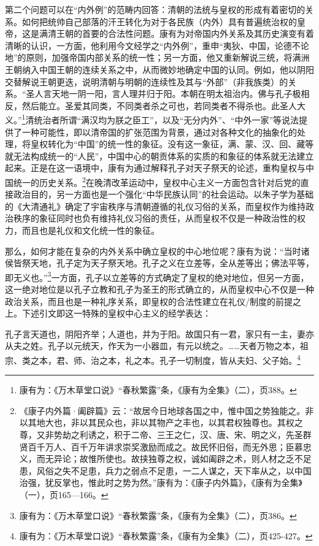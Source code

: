 \documentclass[a4paper, 12pt, openright]{ctexbook}
\renewenvironment{quote}
  {\list{}{\rightmargin2\ccwd \leftmargin2\ccwd \itemindent=2\ccwd \listparindent=2\ccwd}%
   \item\relax\small\kaishu\color{black}}
  {\endlist}
\begin{document}
第二个问题可以在“内外例”的范畴内回答：清朝的法统与皇权的形成有着密切的关系。如何把统帅自己部落的汗王转化为对于各民族（内外）具有普遍统治权的皇帝，这是满清王朝的首要的合法性问题。康有为对帝国内外关系及其历史演变有着清晰的认识，一方面，他利用今文经学之“内外例”，重申“夷狄、中国，论德不论地”的原则，加强帝国内部关系的统一性；另一方面，他又重新解说三统，将满洲王朝纳入中国王朝的连续关系之中，从而微妙地确定中国的认同。例如，他以阴阳交替解说王朝更迭，说明清朝与明朝的连续性及其与“外部”（非我族类）的关系。“圣人言天地一阴一阳，言人理并归于阳。本朝在明太祖治内。佛与孔子极相反，然后能立。圣爱其同类，不同类者杀之可也，若同类者不得杀也。此圣人大义。”\footnote{康有为：《万木草堂口说》“春秋繁露”条，《康有为全集》（二），页388。}清统治者所谓“满汉均为朕之臣工”，以及“无分内外”、“中外一家”等说法提供了一种可能性，即以清帝国的扩张范围为背景，通过对各种文化的抽象化的处理，将皇权转化为“中国”的统一性的象征。没有这一象征，满、蒙、汉、回、藏等就无法构成统一的“人民”，中国中心的朝贡体系的实质的和象征的体系就无法建立起来。正是在这一语境中，康有为通过解释孔子对天子祭天的论述，重构皇权与中国统一的历史关系。\footnote{《康子内外篇·阖辟篇》云：“故居今日地球各国之中，惟中国之势独能之。非以其地大也，非以其民众也，非以其物产之丰也，以其君权独尊也。其权之尊，又非势劫之利诱之，积于二帝、三王之仁，汉、唐、宋、明之义，先圣群贤百千万人、百千万年讲求崇奖激励而成之。故民怀旧俗，而无外思；臣慕忠义，而无异论；故惟所使也。故挟独尊之权，诚如阖辟之术，则人材之乏不足患，风俗之失不足患，兵力之弱点不足患，一二人谋之，天下率从之，以中国治强，犹反掌也，惟此时之势为然。”康有为：《康子内外篇》，《康有为全集》（一），页165—166。}在晚清改革运动中，皇权中心主义一方面包含针对后党的直接政治目的，另一方面也是一个强化“中华民族认同”的社会运动。以朱子学为基础的《大清通礼》确定了宇宙秩序与清朝遵循的礼仪习俗的关系，而皇权作为维持政治秩序的象征同时也负有维持礼仪习俗的责任，从而皇权不仅是一种政治性的权力，而且也是礼仪和文化统一性的象征。

那么，如何才能在复杂的内外关系中确立皇权的中心地位呢？康有为说：“当时诸侯皆祭天地，孔子定为天子祭天地。孔子之义在立差等，全从差等出；佛法平等，即无义也。”\footnote{康有为：《万木草堂口说》“春秋繁露”条，《康有为全集》（二），页386。}一方面，孔子以立差等的方式确定了皇权的绝对地位，但另一方面，这一绝对地位是以孔子立教和孔子为圣王的形式确立的，从而皇权中心不仅是一种政治关系，而且也是一种礼序关系，即皇权的合法性建立在礼仪/制度的前提之上。下述引文即这一特殊的皇权中心主义的经学表达：

\begin{quote}
孔子言天道也，阴阳齐举；人道也，并为于阳。故国只有一君，家只有一主，妻亦从夫之姓。孔子以元统天，作天为一小器皿，有元以统之。……天者万物之本，祖宗、类之本，君、师、治之本，礼之本。孔子一切制度，皆从夫妇、父子始。\footnote{康有为：《万木草堂口说》“春秋繁露”条，《康有为全集》（二），页425-427。}
\end{quote}
\end{document}
